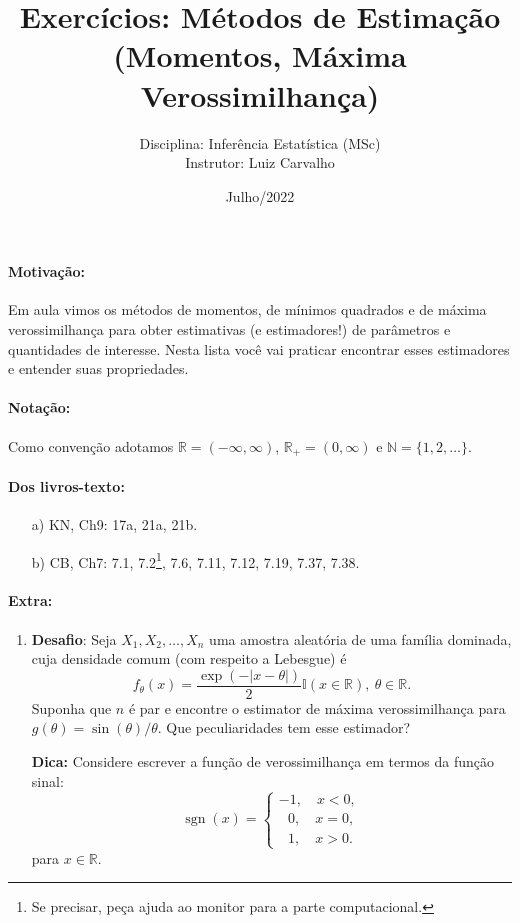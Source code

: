 \documentclass[a4paper,10pt, notitlepage]{report}
\title{Exercícios: Métodos de Estimação (Momentos, Máxima Verossimilhança)}
\author{Disciplina: Inferência Estatística (MSc) \\ Instrutor: Luiz Carvalho}
\date{Julho/2022}
\newcommand{\rs}{X_1, X_2, \ldots, X_n} %
\newcommand{\rpl}{\mathbb{R}_+}
\begin{document}
\maketitle

\paragraph{Motivação:} Em aula vimos os métodos de momentos, de mínimos quadrados e de máxima verossimilhança para obter estimativas (e estimadores!) de parâmetros e quantidades de interesse. Nesta lista você vai praticar encontrar esses estimadores e entender suas propriedades.

\paragraph{Notação:} Como convenção adotamos $\mathbb{R} = (-\infty, \infty)$, $\rpl = (0, \infty)$ e $\mathbb{N} = \{1, 2, \ldots \}$.

\paragraph{Dos livros-texto:}

\begin{itemize}
    \item[a)] KN, Ch9: 17a, 21a, 21b.
    \item[b)] CB, Ch7: 7.1, 7.2\footnote{Se precisar, peça ajuda ao monitor para a parte computacional.}, 7.6, 7.11, 7.12, 7.19, 7.37, 7.38.
\end{itemize}


\paragraph{Extra:}

\begin{enumerate}
    \item \textbf{Desafio}:  Seja $\rs$ uma amostra aleatória de uma família dominada, cuja densidade comum (com respeito a Lebesgue) é  $$ f_\theta(x) = \frac{\exp(-|x-\theta|)}{2}\mathbb{I}(x \in \mathbb{R}), \: \theta \in \mathbb{R}.$$
    Suponha que $n$ é par e encontre o estimator de máxima verossimilhança para $g(\theta) = \sin(\theta)/\theta$.
    Que peculiaridades tem esse estimador?
    
    \textbf{Dica:} Considere escrever a função de verossimilhança em termos da função sinal:
    \begin{equation*}
\operatorname{sgn}(x)=
\begin{cases}
-1,\quad x < 0,\\
\:\:\:0, \quad x = 0,\\
\:\:\:1, \quad x > 0.
\end{cases}
    \end{equation*}
    para $x \in \mathbb{R}$.
\end{enumerate}



% 
% 
\end{document}
